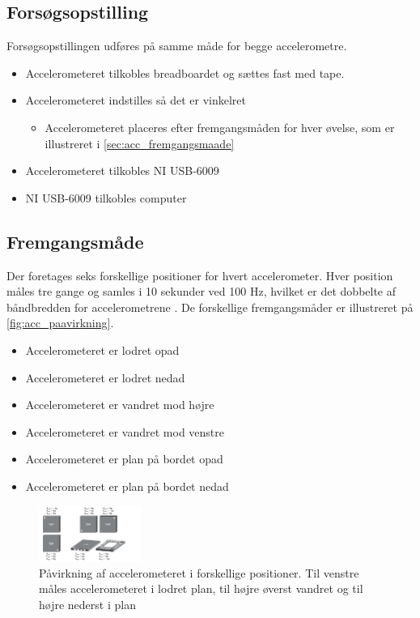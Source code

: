 \subsection{Forsøgsopstilling}
Forsøgsopstillingen udføres på samme måde for begge accelerometre.
\begin{itemize}
\item Accelerometeret tilkobles breadboardet og sættes fast med tape.
\item Accelerometeret indstilles så det er vinkelret
\begin{itemize}
\item Accelerometeret placeres efter fremgangsmåden for hver øvelse, som er illustreret i \autoref{sec:acc_fremgangsmaade}
\end{itemize}
\item Accelerometeret tilkobles NI USB-6009
\item NI USB-6009 tilkobles computer
\end{itemize}

\subsection{Fremgangsmåde} 
\label{sec:acc_fremgangsmaade}
Der foretages seks forskellige positioner for hvert accelerometer. Hver position måles tre gange og samles i 10 sekunder ved 100 Hz, hvilket er det dobbelte af båndbredden for accelerometrene \citep{analogdevices2010}. De forskellige fremgangsmåder er illustreret på \autoref{fig:acc_paavirkning}. 
\begin{itemize}
\item Accelerometeret er lodret opad
\item Accelerometeret er lodret nedad
\item Accelerometeret er vandret mod højre
\item Accelerometeret er vandret mod venstre
\item Accelerometeret er plan på bordet opad
\item Accelerometeret er plan på bordet nedad
\end{itemize}

\begin{figure}[H]
\centering
\includegraphics[width=0.3\textwidth]{figures/acc_paavirkning}
\caption{Påvirkning af accelerometeret i forskellige positioner. Til venstre måles accelerometeret i lodret plan, til højre øverst vandret og til højre nederst i plan \citep{analogdevices2010}}
\label{fig:acc_paavirkning}
\end{figure}

